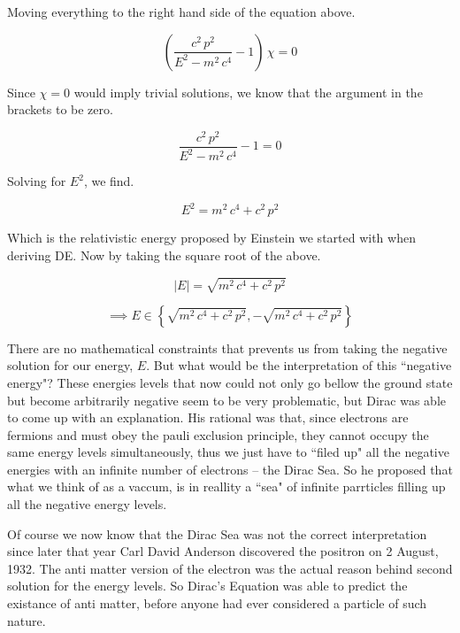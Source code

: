 \documentclass[a4page,12pt]{article}
\begin{document}
	Moving everything to the right hand side of the equation above.

	\[
		\left(\dfrac{c^2 \,p^2}{E^2 - m^2\,c^4} - 1 \right) \, \chi = 0
	\]

	Since $\chi = 0$ would imply trivial solutions, we know that the argument in the brackets to be zero.

	\[
		\dfrac{c^2 \,p^2}{E^2 - m^2\,c^4} - 1 = 0
	\]

	Solving for $E^2$, we find.

	\[
		E^2 = m^2\,c^4 + c^2 \,p^2
	\]

	Which is the relativistic energy proposed by Einstein we started with when deriving DE. Now by taking the square root of the above.

	\[
		\left|E\right| = \sqrt{m^2\,c^4 + c^2 \,p^2}
	\]

	\[
		\implies E \in \left\{\sqrt{m^2\,c^4 + c^2 \,p^2}, - \sqrt{m^2\,c^4 + c^2 \,p^2} \right\}
	\]

	There are no mathematical constraints that prevents us from taking the negative solution for our energy, $E$. But what would be the interpretation of this ``negative energy"? These energies levels that now could not only go bellow the ground state but become arbitrarily negative seem to be very problematic, but Dirac was able to come up with an explanation. His rational was that, since electrons are fermions and must obey the pauli exclusion principle, they cannot occupy the same energy levels simultaneously, thus we just have to ``filed up" all the negative energies with an infinite number of electrons -- the Dirac Sea. So he proposed that what we think of as a vaccum, is in reallity a ``sea" of infinite parrticles filling up all the negative energy levels.

	Of course we now know that the Dirac Sea was not the correct interpretation since later that year Carl David Anderson discovered the positron on 2 August, 1932. The anti matter version of the electron was the actual reason behind second solution for the energy levels. So Dirac's Equation was able to predict the existance of anti matter, before anyone had ever considered a particle of such nature.


	
\end{document}
